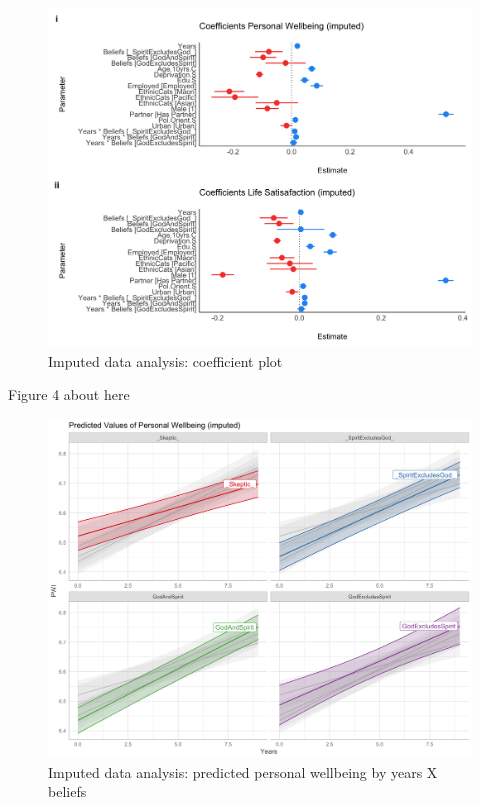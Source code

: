 \documentclass[
  english,
  man]{apa6}
\begin{document}
\begin{figure}
\includegraphics[width=6.4in]{Figs/coefficient_plot_both_imputed-1} \caption{Imputed data analysis: coefficient plot}\label{fig:unnamed-chunk-4}
\end{figure}

Figure 4 about here

\begin{figure}
\includegraphics[width=6.4in]{Figs/predicted_PWI_impute-1} \caption{Imputed data analysis: predicted personal wellbeing by years X beliefs}\label{fig:unnamed-chunk-5}
\end{figure}
\end{document}
